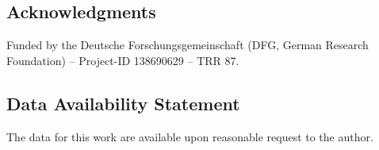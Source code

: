 \documentclass[AMA,STIX2COL]{WileyNJD-v2} %
\begin{document}
\subsection*{Acknowledgments} Funded by the Deutsche Forschungsgemeinschaft (DFG, German Research Foundation) – Project-ID 138690629 – TRR 87.

\subsection*{Data Availability Statement}
The data for this work are available upon reasonable request to the author.


\end{document}
